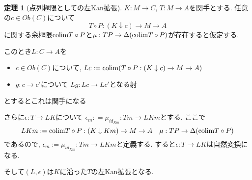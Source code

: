 \documentclass[dvipdfmx,a4paper,11pt]{article}
\newcommand{\colim}{{\rm colim}}
\theoremstyle{definition}
\newtheorem{thm}{定理}
\begin{document}
 \begin{tcolorbox}
 [colback = white, colframe = green!35!black, fonttitle = \bfseries,breakable = true]
\begin{thm}[点列極限としての左Kan拡張]
\label{thm-leftKan-extension}
$K : M \to C$, $T : M \to A$を関手とする.
任意の$c \in Ob(C)$について
$$
T \circ P : (K \downarrow c ) \to M \to A
$$
に関する余極限$\colim T\circ P$と$\mu:  TP \to \Delta (\colim T\circ P)$が存在すると仮定する.

このとき$L : C \to A$を
\begin{itemize}
\item $c \in Ob(C)$について, $Lc : = \colim (T \circ P : (K \downarrow c ) \to M \to A)$
\item $g : c \to c'$について $Lg : Lc \to Lc'$となる射
\end{itemize}
とするとこれは関手になる

さらに$\epsilon : T \to LK $について
$\epsilon_{m}: = \mu_{ id_{Km}}:  Tm \to LKm$とする.
ここで
$$
LKm := \colim T \circ P : (K \downarrow Km ) \to M \to A
\quad
\mu: TP \to\Delta (\colim T\circ P)
$$
であるので, 
$\epsilon_{m} := \mu_{ id_{Km}} : Tm \to LKm $と定義する.
すると$\epsilon : T \to LK $は自然変換になる.

そして$(L,\epsilon)$は$K$に沿った$T$の左Kan拡張となる. 
\end{thm}
\end{tcolorbox}
\end{document}
